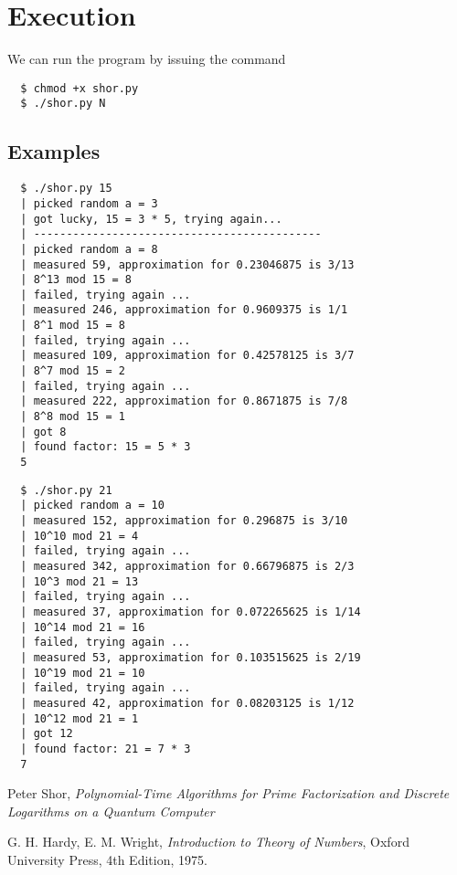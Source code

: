 \documentclass{article}
\begin{document}
\section{Execution}

We can run the program by issuing the command
\begin{lstlisting}
  $ chmod +x shor.py
  $ ./shor.py N
\end{lstlisting}

\subsection{Examples}

\begin{lstlisting}
  $ ./shor.py 15
  | picked random a = 3
  | got lucky, 15 = 3 * 5, trying again...
  | --------------------------------------------
  | picked random a = 8
  | measured 59, approximation for 0.23046875 is 3/13
  | 8^13 mod 15 = 8
  | failed, trying again ...
  | measured 246, approximation for 0.9609375 is 1/1
  | 8^1 mod 15 = 8
  | failed, trying again ...
  | measured 109, approximation for 0.42578125 is 3/7
  | 8^7 mod 15 = 2
  | failed, trying again ...
  | measured 222, approximation for 0.8671875 is 7/8
  | 8^8 mod 15 = 1
  | got 8
  | found factor: 15 = 5 * 3
  5
\end{lstlisting}


\begin{lstlisting}
  $ ./shor.py 21
  | picked random a = 10
  | measured 152, approximation for 0.296875 is 3/10
  | 10^10 mod 21 = 4
  | failed, trying again ...
  | measured 342, approximation for 0.66796875 is 2/3
  | 10^3 mod 21 = 13
  | failed, trying again ...
  | measured 37, approximation for 0.072265625 is 1/14
  | 10^14 mod 21 = 16
  | failed, trying again ...
  | measured 53, approximation for 0.103515625 is 2/19
  | 10^19 mod 21 = 10
  | failed, trying again ...
  | measured 42, approximation for 0.08203125 is 1/12
  | 10^12 mod 21 = 1
  | got 12
  | found factor: 21 = 7 * 3
  7 
\end{lstlisting}

\begin{thebibliography}{9}
  Peter Shor,
  \emph{Polynomial-Time Algorithms for Prime Factorization and Discrete
Logarithms on a Quantum Computer}

  G. H. Hardy,
  E. M. Wright,
  \emph{Introduction to Theory of Numbers},
  Oxford University Press,
  4th Edition,
  1975.

\end{thebibliography}
\end{document}
